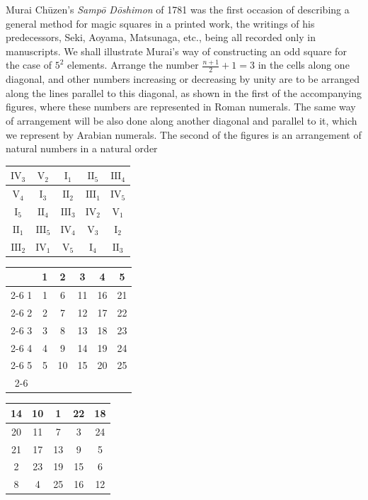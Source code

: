 \documentclass[11pt]{article}
\begin{document}
Murai Chūzen's \emph{Sampō Dōshimon} of 1781 was the first occasion
of describing a general method for magic squares in a printed work,
the writings of his predecessors, Seki, Aoyama, Matsunaga, etc., being
all recorded only in manuscripts. We shall illustrate Murai's way of
constructing an odd square for the case of $5^2$ elements. Arrange the
number $\frac{n+1}{2}+1=3$ in the cells along one diagonal, and other numbers
increasing or decreasing by unity are to be arranged along the lines
parallel to this diagonal, as shown in the first of the accompanying
figures, where these numbers are represented in Roman numerals. The
same way of arrangement will be also done along another diagonal
and parallel to it, which we represent by Arabian numerals. The second
of the figures is an arrangement of natural numbers in a natural order
\begin{center}
\begin{tabular}[b]{|c|c|c|c|c|}
\hline
$\mathrm{IV}_3$ & $\mathrm{V}_2$ & $\mathrm{I}_1$ & $\mathrm{II}_5$ & $\mathrm{III}_4$\\ \hline
$\mathrm{V}_4$ & $\mathrm{I}_3$ & $\mathrm{II}_2$ & $\mathrm{III}_1$ & $\mathrm{IV}_5$\\ \hline
$\mathrm{I}_5$ & $\mathrm{II}_4$ & $\mathrm{III}_3$ & $\mathrm{IV}_2$ & $\mathrm{V}_1$\\ \hline
$\mathrm{II}_1$ & $\mathrm{III}_5$ & $\mathrm{IV}_4$ & $\mathrm{V}_3$ & $\mathrm{I}_2$\\ \hline
$\mathrm{III}_2$ & $\mathrm{IV}_1$ & $\mathrm{V}_5$ & $\mathrm{I}_4$ & $\mathrm{II}_3$\\ \hline
\end{tabular}\quad
\begin{tabular}[b]{c|c|c|c|c|c|}
\multicolumn{1}{c}{} & \multicolumn{1}{c}{1} & \multicolumn{1}{c}{2} & \multicolumn{1}{c}{3} & \multicolumn{1}{c}{4} & \multicolumn{1}{c}{5}\\ \cline{2-6}
1 & 1 & 6 & 11 & 16 & 21\\ \cline{2-6}
2 & 2 & 7 & 12 & 17 & 22\\ \cline{2-6}
3 & 3 & 8 & 13 & 18 & 23\\ \cline{2-6}
4 & 4 & 9 & 14 & 19 & 24\\ \cline{2-6}
5 & 5 & 10 & 15 & 20 & 25\\ \cline{2-6}
\end{tabular}\quad
\begin{tabular}[b]{|c|c|c|c|c|}
\hline
14 & 10 & 1 & 22 & 18\\ \hline
20 & 11 & 7 & 3 & 24\\ \hline
21 & 17 & 13 & 9 & 5\\ \hline
2 & 23 & 19 & 15 & 6\\ \hline
8 & 4 & 25 & 16 & 12\\ \hline
\end{tabular}
\end{center}
\end{document}
